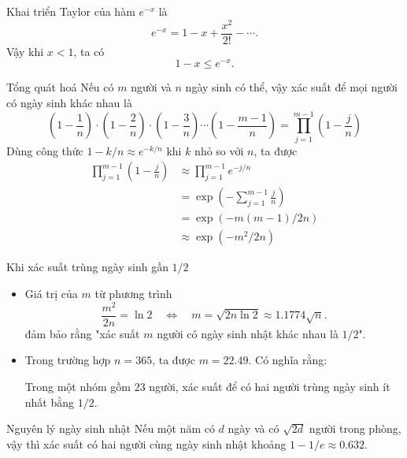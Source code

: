 \begin{frame}
	Khai triển Taylor của hàm $e^{-x}$ là 
	\[
		e^{-x} = 1 - x + \frac{x^2}{2!} - \cdots.
	\]
	Vậy khi $x<1$, ta có 
	\[
		1 - x \leq e^{-x}.
	\]
\end{frame}
\begin{frame}{Tổng quát hoá}
Nếu có $m$ người và $n$ ngày sinh có thể, vậy xác suất để mọi người có ngày sinh khác nhau là 
\[
	\left(1 - \frac{1}{n}\right) \cdot \left(1 - \frac{2}{n}\right) \cdot \left(1 - \frac{3}{n}\right) \cdots \left(1 - \frac{m-1}{n}\right) = \prod_{j=1}^{m-1} \left(1 - \frac{j}{n}\right)
\]
Dùng công thức $1-k/n \approx e^{-k/n}$ khi $k$ nhỏ so với $n$, ta được 
\begin{align*}
		\prod_{j=1}^{m-1} \left(1 - \frac{j}{n}\right) &\approx \prod_{j=1}^{m-1} e^{-j/n}\\
			                                           &= \exp\left(-\sum_{j=1}^{m-1} \frac{j}{n}\right)\\
													   &=\exp\left(-m(m-1)/2n\right)\\
													   &\approx \exp(-m^2/2n) 
\end{align*}
	
\end{frame}
\begin{frame}{Khi xác suất trùng ngày sinh gần $1/2$}
	\begin{itemize}
		\item 	Giá trị của $m$ từ phương trình 
	\[
		\frac{m^2}{2n} = \ln 2\quad \Longleftrightarrow\quad m = \sqrt{2n\ln 2} \approx 1.1774 \sqrt{n}. 
	\]
	đảm bảo rằng "xác suất $m$ người có ngày sinh nhật khác nhau là $1/2$".
	
	
	
	\item Trong trường hợp $n=365$, ta được $m = 22.49$.  Có nghĩa rằng:
	\begin{block}{}
	 Trong một nhóm gồm $23$ người, xác suất để có hai người trùng ngày sinh ít nhất bằng $1/2$.		
	\end{block}

	\end{itemize}

\end{frame}

\begin{frame}
	\begin{block}{Nguyên lý ngày sinh nhật}
		Nếu một năm có $d$ ngày và có $\sqrt{2d}$ người trong phòng, vậy thì xác suất có hai người cùng ngày sinh nhật khoảng $1 - 1/e \approx 0.632$.
	\end{block}

\end{frame}

